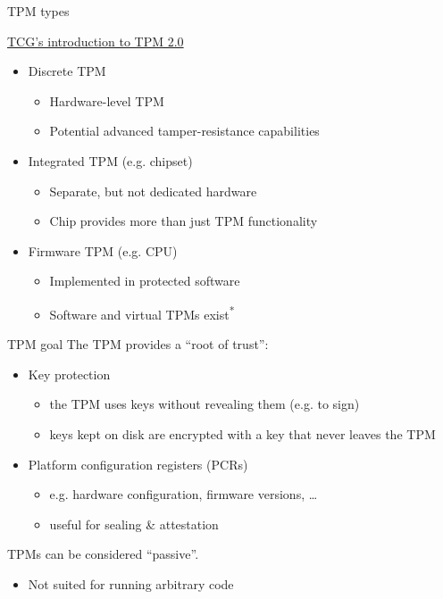 \begin{frame}{TPM types}
  \begin{center}
    \href{https://trustedcomputinggroup.org/wp-content/uploads/TPM-2.0-A-Brief-Introduction.pdf}{TCG's introduction to TPM 2.0}
  \end{center}

  \begin{itemize}[<+(1)->]
    \item Discrete TPM
    \par
    \begin{itemize}
      \item Hardware-level TPM
      \item Potential advanced tamper-resistance capabilities
    \end{itemize}
    \item Integrated TPM (e.g. chipset)
    \par
    \begin{itemize}
      \item Separate, but not dedicated hardware
      \item Chip provides more than just TPM functionality
    \end{itemize}
    \item Firmware TPM (e.g. CPU)
    \begin{itemize}
      \item Implemented in protected software
      \item Software and virtual TPMs exist\textsuperscript{*}
    \end{itemize}
  \end{itemize}
\end{frame}

\begin{frame}{TPM goal}
  The TPM provides a \enquote{root of trust}:
  \begin{itemize}
    \item Key protection
    \par
    \begin{itemize}
      \item the TPM uses keys without revealing them (e.g. to sign)
      \item keys kept on disk are encrypted with a key that never leaves the TPM
    \end{itemize}
    \item Platform configuration registers (PCRs)
    \begin{itemize}
      \item e.g. hardware configuration, firmware versions, \dots
      \item useful for sealing \& attestation
    \end{itemize}
  \end{itemize}

  \vspace*{1em}

  \pause
  TPMs can be considered \enquote{passive}.
  \begin{itemize}
    \item Not suited for running arbitrary code
  \end{itemize}
\end{frame}

